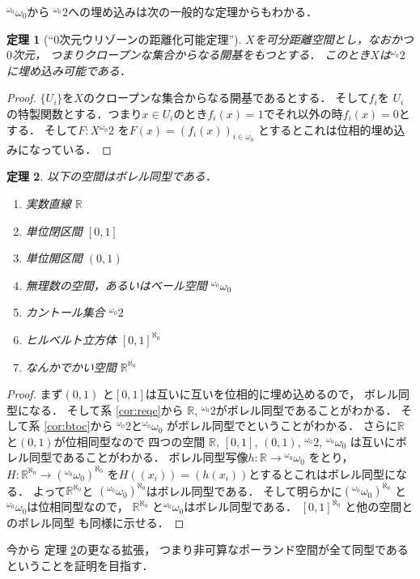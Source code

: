 \documentclass[leqno, 12pt]{jsarticle}
\newtheorem{thm}{定理}
\newcommand{\rr}{\mathbb{R}}
\newcommand{\myomega}{\omega_{0}}
\newcommand{\mycantor}{{}^{\myomega}2}
\newcommand{\mybaire}{{}^{\myomega}\myomega}
\begin{document}
$\mybaire$から
$\mycantor$への埋め込みは次の一般的な定理からもわかる．
\begin{thm}[``$0$次元ウリゾーンの距離化可能定理'']
\label{thm:0ury}
$X$を可分距離空間とし，なおかつ$0$次元，
つまりクロープンな集合からなる開基をもつとする．
このとき$X$は$\mycantor$に埋め込み可能である．
\end{thm}
\begin{proof}
$\{U_{i}\}$を$X$のクロープンな集合からなる開基であるとする．
そして$f_{i}$を
$U_{i}$の特製関数とする．つまり$x\in U_{i}$のとき$f_{i}(x)=1$でそれ以外の時$f_{i}(x)=0$とする．
そして$F\colon X \mycantor$
を$F(x)=(f_{i}(x))_{i\in \myomega}$
とするとこれは位相的埋め込みになっている．
\end{proof}

\begin{thm}\label{thm:mainbb}
以下の空間はボレル同型である．
\begin{enumerate}
\item 
実数直線
$\rr$
\item 
単位閉区間
$[0, 1]$

\item 
単位開区間
$(0, 1)$
\item 
無理数の空間，あるいはベール空間
${}^{\myomega}\myomega$
\item 
カントール集合
$\mycantor$
\item 
ヒルベルト立方体
$[0, 1]^{\aleph_{0}}$
\item 
なんかでかい空間
$\rr^{\aleph_{0}}$

\end{enumerate}
\end{thm}
\begin{proof}
まず$(0, 1)$
と$[0, 1]$は互いに互いを位相的に埋め込めるので，
ボレル同型になる．
そして系 \ref{cor:reqc}から
$\rr$, $\mycantor$がボレル同型であることがわかる．
そして系 \ref{cor:btoc}から
$\mycantor$と$\mybaire$
がボレル同型でということがわかる．
さらに$\rr$と$(0, 1)$が位相同型なので
四つの空間
$\rr$, $[0, 1]$, 
$(0, 1)$, 
$\mycantor$, 
$\mybaire$
は互いにボレル同型であることがわかる．
ボレル同型写像$h\colon \rr\to \mybaire$
をとり，
$H\colon \rr^{\aleph_{0}}\to (\mybaire)^{\aleph_{0}}$
を$H((x_{i}))=(h(x_{i}))$とするとこれはボレル同型になる．
よって$\rr^{\aleph_{0}}$と
$(\mybaire)^{\aleph_{0}}$はボレル同型である．
そして明らかに$(\mybaire)^{\aleph_{0}}$
と$\mybaire$は位相同型なので，
$\rr^{\aleph_{0}}$
と$\mybaire$はボレル同型である．
$[0, 1]^{\aleph_{0}}$
と他の空間とのボレル同型
も同様に示せる．
\end{proof}
今から
定理 \ref{thm:mainbb}の更なる拡張，
つまり非可算なポーランド空間が全て同型であるということを証明を目指す．
\end{document}
